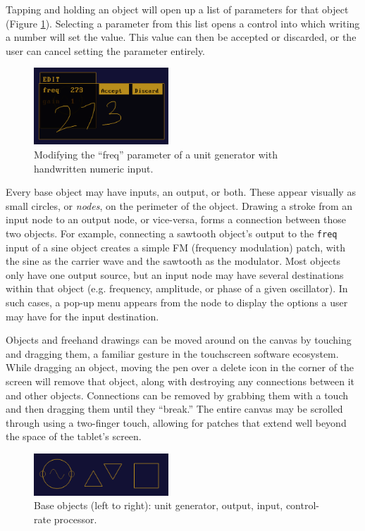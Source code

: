 \documentclass[10pt,letterpaper]{article}
\begin{document}
Tapping and holding an object will open up a list of parameters for that object (Figure \ref{fig:editor}). 
Selecting a parameter from this list opens a control into which writing a number will set the value. 
This value can then be accepted or discarded, or the user can cancel setting the parameter entirely. 

\begin{figure}[h]
	\centering
		\includegraphics[width=0.45\textwidth]{figures/editor.png}
	\caption{Modifying the ``freq'' parameter of a unit generator with handwritten numeric input.}
	\label{fig:editor}
\end{figure}

Every base object may have inputs, an output, or both. These appear visually as small circles, or \emph{nodes}, on the perimeter of the object. 
Drawing a stroke from an input node to an output node, or vice-versa, forms a connection between those two objects. 
For example, connecting a sawtooth object's output to the \texttt{freq} input of a sine object creates a simple FM (frequency modulation) patch, with the sine as the carrier wave and the sawtooth as the modulator. 
Most objects only have one output source, but an input node may have several destinations within that object (e.g. frequency, amplitude, or phase of a given oscillator). 
In such cases, a pop-up menu appears from the node to display the options a user may have for the input destination. 

Objects and freehand drawings can be moved around on the canvas by touching and dragging them, a familiar gesture in the touchscreen software ecosystem. 
While dragging an object, moving the pen over a delete icon in the corner of the screen will remove that object, along with destroying any connections between it and other objects. 
Connections can be removed by grabbing them with a touch and then dragging them until they ``break.''
The entire canvas may be scrolled through using a two-finger touch, allowing for patches that extend well beyond the space of the tablet's screen. 

\begin{figure}[h]
	\centering
		\includegraphics[width=0.45\textwidth]{figures/baseobjects.png}
	\caption{Base objects (left to right): unit generator, output, input, control-rate processor.}
	\label{fig:baseObjects}
\end{figure}
\end{document}

